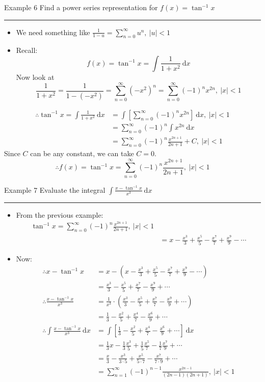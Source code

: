 \documentclass[12pt,a4paper]{article}
\def\d{{\mathrm{d}}}
\def\dx{\d x}
\begin{document}
\begin{eg}{Example 6}
	Find a power series representation for $f(x)=\tan^{-1}x$\\
	\noindent\rule[0.25\baselineskip]{\textwidth}{1pt}
	\begin{itemize}
		\item We need something like $\displaystyle\frac{1}{1-u}=\sum^\infty_{n=0}u^n,\ |u|<1$
		\item Recall: $$f(x)=\tan^{-1} x=\int\frac{1}{1+x^2}\ \dx$$ Now look at $$\frac{1}{1+x^2}=\frac{1}{1-(-x^2)}=\sum^\infty_{n=0}(-x^2)^n=\sum^\infty_{n=0}(-1)^nx^{2n},\ |x|<1$$
	\end{itemize}
	$$\begin{aligned}
	\therefore\tan^{-1}x=\int\frac{1}{1+x^2}\ \dx&=\int\left[\sum^\infty_{n=0}(-1)^nx^{2n}\right]\ \dx,\ |x|<1\\
	&=\sum^\infty_{n=0}(-1)^n\int x^{2n}\ \dx\\
	&=\sum^\infty_{n=0}(-1)^n\frac{x^{2n+1}}{2n+1}+C,\ |x|<1
	\end{aligned}$$
	Since $C$ can be any constant, we can take $C=0$. $$\therefore f(x)=\tan^{-1}x=\sum^\infty_{n=0}(-1)^n\frac{x^{2n+1}}{2n+1},\ |x|<1$$
\end{eg}
\begin{eg}{Example 7}
	Evaluate the integral $\displaystyle\int\frac{x-\tan^{-1}x}{x^3}\ \dx$\\
	\noindent\rule[0.25\baselineskip]{\textwidth}{1pt}
	\begin{itemize}
		\item From the previous example: $$\begin{aligned}\tan^{-1}x=\sum^\infty_{n=0}(-1)^n\frac{x^{2n+1}}{2n+1},\ |x|<1\\&=x-\frac{x^3}{3}+\frac{x^5}{5}-\frac{x^7}{7}+\frac{x^9}{9}-\cdots\end{aligned}$$
		\item Now: 
		$$\begin{aligned}
			\therefore x-\tan^{-1}x&=x-\left(x-\frac{x^3}{3}+\frac{x^5}{5}-\frac{x^7}{7}+\frac{x^9}{9}-\cdots\right)\\
			&=\frac{x^3}{3}-\frac{x^5}{5}+\frac{x^7}{7}-\frac{x^9}{9}+\cdots\\
			\therefore\frac{x-\tan^{-1}x}{x^3}&=\frac{1}{x^3}\cdot\left(\frac{x^3}{3}-\frac{x^5}{5}+\frac{x^7}{7}-\frac{x^9}{9}+\cdots\right)\\
			&=\frac{1}{3}-\frac{x^2}{5}+\frac{x^4}{7}-\frac{x^6}{9}+\cdots\\
			\therefore\int\frac{x-\tan^{-1}x}{x^3}\ \dx&=\int\left[\frac{1}{3}-\frac{x^2}{5}+\frac{x^4}{7}-\frac{x^6}{9}+\cdots\right]\ \dx\\
			&=\frac{1}{3}x-\frac{1}{3}\frac{x^3}{5}+\frac{1}{5}\frac{x^5}{7}-\frac{1}{7}\frac{x^7}{9}+\cdots\\
			&=\frac{x}{3}-\frac{x^3}{3\cdot5}+\frac{x^5}{5\cdot7}-\frac{x^7}{7\cdot9}+\cdots\\
			&=\sum^\infty_{n=1}(-1)^{n-1}\frac{x^{2n-1}}{(2n-1)(2n+1)},\ |x|<1
		\end{aligned}$$
	\end{itemize}
\end{eg}
\end{document}
